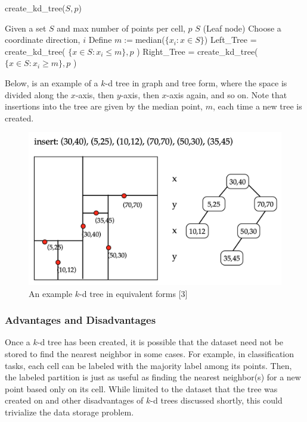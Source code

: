 \begin{algorithm}
\caption{create\_kd\_tree($S, p$)}
\begin{algorithmic} 
\REQUIRE Given a set $S$ and max number of points per cell, $p$
 \STATE \RETURN $S$ (Leaf node) \ENDIF
\STATE Choose a coordinate direction, $i$
\STATE Define $m:=$median($\{x_i:x\in S\}$)
\STATE Left\_Tree = create\_kd\_tree( $\{x\in S: x_i\leq m\}, p$ )
\STATE Right\_Tree = create\_kd\_tree( $\{x\in S: x_i\geq m\}, p$ )
\STATE {}
\end{algorithmic}
\end{algorithm}


Below, is an example of a $k$-d tree in graph and tree form, where the space is divided along the $x$-axis, then $y$-axis, then $x$-axis again, and so on. Note that insertions into the tree are given by the median point, $m$, each time a new tree is created.

\begin{figure}[H]
    \centering
    \includegraphics[width=12cm]{chapter_11/files/kd_tree.png}
    \caption{An example $k$-d tree in equivalent forms [3]}
\end{figure}

\subsubsection{Advantages and Disadvantages}
Once a $k$-d tree has been created, it is possible that the dataset need not be stored to find the nearest neighbor in some cases. For example, in classification tasks, each cell can be labeled with the majority label among its points. Then, the labeled partition is just as useful as finding the nearest neighbor(s) for a new point based only on its cell. While limited to the dataset that the tree was created on and other disadvantages of $k$-d trees discussed shortly, this could trivialize the data storage problem. 

